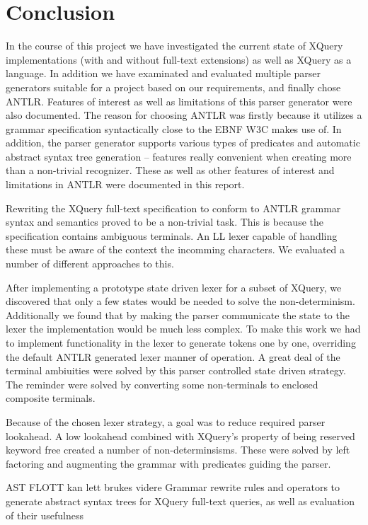 \chapter{Conclusion}
\label{chapter:conclusion}

In the course of this project we have investigated the current state of XQuery implementations (with and without full-text extensions) as well as XQuery as a language. In addition we have examinated and evaluated multiple parser generators suitable for a project based on our requirements, and finally chose ANTLR. Features of interest as well as limitations of this parser generator were also documented.
The reason for choosing ANTLR was firstly because it utilizes a grammar specification syntactically close to the EBNF W3C makes use of. In addition, the parser generator supports various types of predicates and automatic abstract syntax tree generation -- features really convenient when creating more than a non-trivial recognizer. These as well as other features of interest and limitations in ANTLR were documented in this report.

Rewriting the XQuery full-text specification to conform to ANTLR grammar syntax and semantics proved to be a non-trivial task. This is because the specification contains ambiguous terminals. An LL lexer capable of handling these must be aware of the context the incomming characters. We evaluated a number of different approaches to this. 

After implementing a prototype state driven lexer for a subset of XQuery, we discovered that only a few states would be needed to solve the non-determinism. Additionally we found that by making the parser communicate the state to the lexer the implementation would be much less complex. To make this work we had to implement functionality in the lexer to generate tokens one by one, overriding the default ANTLR generated lexer manner of operation. A great deal of the terminal ambiuities were solved by this parser controlled state driven strategy. The reminder were solved by converting some non-terminals to enclosed composite terminals.

Because of the chosen lexer strategy, a goal was to reduce required parser lookahead. A low lookahead combined with XQuery's property of being reserved keyword free created a number of non-determinsisms. These were solved by left factoring and augmenting the grammar with predicates guiding the parser.

AST FLOTT kan lett brukes videre \rightarrow Grammar rewrite rules and operators to generate abstract syntax trees for XQuery full-text queries, as well as evaluation of their usefulness

